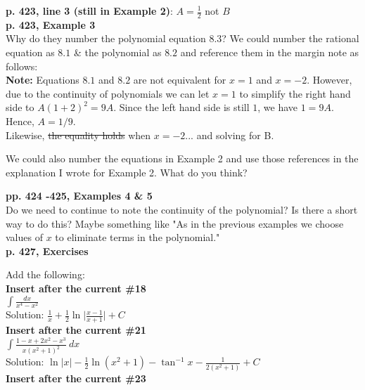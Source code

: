 \documentclass[11pt]{report}
\begin{document}
\textbf{p. 423, line 3 (still in Example 2)}: $A=\frac{1}{2}$ not $B$\\

\textbf{p. 423, Example 3}\\
Why do they number the polynomial equation $8.3$? We could number the rational equation as $8.1$ \& the polynomial as $8.2$ and reference them in the margin note as follows:\\

\textbf{Note:} Equations $8.1$ and $8.2$ are not equivalent for $x=1$ and $x=-2$. However, due to the continuity of polynomials we can let $x=1$ to simplify the right hand side to $A(1+2)^2 = 9A$. Since the left hand side is still $1$, we have $1=9A$. Hence, $A=1/9$.\\
Likewise, \sout{the equality holds} when $x=-2$... and solving for B.
 
We could also number the equations in Example 2 and use those references in the explanation I wrote for Example 2. What do you think?

\textbf{pp. 424 -425, Examples 4 \& 5}\\
Do we need to continue to note the continuity of the polynomial? Is there a short way to do this? Maybe something like "As in the previous examples we choose values of $x$ to eliminate terms in the polynomial."\\


\textbf{p. 427, Exercises}

Add the following:\\

\textbf{Insert after the current \#18}\\

$\displaystyle \int \frac{dx}{x^4-x^2}$\\

Solution: $\displaystyle \frac{1}{x} + \frac{1}{2} \ln \biggl|\frac{x-1}{x+1}\biggr| + C$\\

\textbf{Insert after the current \#21}\\ 

$\displaystyle \int \frac{1-x+2x^2-x^3}{x(x^2+1)^2}~dx$\\

Solution: $\displaystyle \ln |x| - \frac{1}{2} \ln (x^2+1) - \tan^{-1} x -\frac{1}{2(x^2 +1)} + C$\\

\textbf{Insert after the current \#23}\\ 
\end{document}
